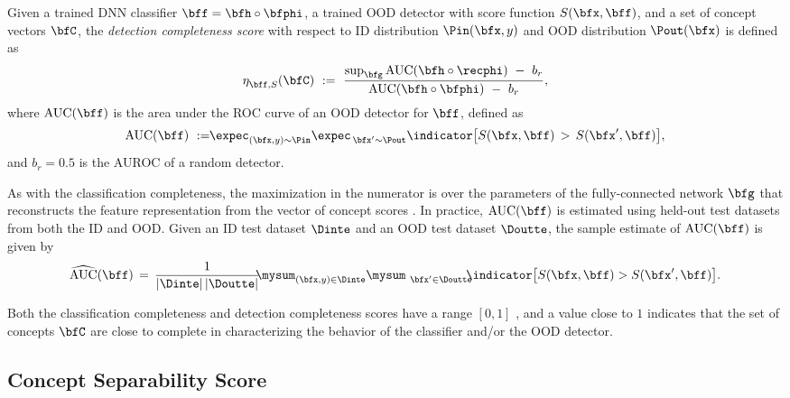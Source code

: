 \begin{definition}
\label{def:completeness_detec}
Given a trained DNN classifier $\bff = \bfh \circ \bfphi$, a trained OOD detector with score function $S(\bfx, \bff)$, and a set of concept vectors $\bfC$, the {\em detection completeness score} with respect to ID distribution $\Pin(\bfx, y)$ and OOD distribution $\Pout(\bfx)$ is defined as
\begin{align}
\label{equ: completeness-detection}
    \eta^{}_{\bff, S}(\bfC) 
    ~:=~ \frac{\textrm{sup}_\bfg \,\textrm{AUC}(\bfh \circ \recphi) ~-~ b_r}{\textrm{AUC}(\bfh \circ \bfphi) ~-~ b_r},
\end{align}
where $\textrm{AUC}(\bff)$ is the area under the ROC curve of an OOD detector for $\bff$, defined as
\begin{align}
\label{equ:auroc_ideal}
\textrm{AUC}(\bff) ~:= \!\!\expec_{(\bfx, y) \sim \Pin} \expec_{\,\bfx^\prime \sim \Pout} \indicator\big[ S(\bfx, \bff) \,>\, S(\bfx^\prime, \bff) \big],
\end{align}
and $b_r = 0.5$ is the AUROC of a random detector.
\end{definition}
As with the classification completeness, the maximization in the numerator is over the parameters of the fully-connected network $\bfg$ that reconstructs the feature representation from the vector of concept scores .
In practice, $\textrm{AUC}(\bff)$ is estimated using held-out test datasets from both the ID and OOD. Given an ID test dataset $\Dinte$ and an OOD test dataset $\Doutte$, the sample estimate of $\textrm{AUC}(\bff)$ is given by
\begin{align*}
    \widehat{\textrm{AUC}}(\bff) \,=\, \frac{1}{|\Dinte|\,|\Doutte|} \!\!\mysum_{(\bfx, y) \in \Dinte} \mysum_{~\bfx^\prime \in \Doutte} \!\!\!\indicator\big[ S(\bfx, \bff) > S(\bfx^\prime, \bff) \big]. 
\end{align*}

Both the classification completeness and detection completeness scores have a range $[0, 1]$  , and a value close to $1$ indicates that the set of concepts $\bfC$ are close to complete in characterizing the behavior of the classifier and/or the OOD detector.

\subsection{Concept Separability Score}
\label{sec:separability_score}
\iffalse

